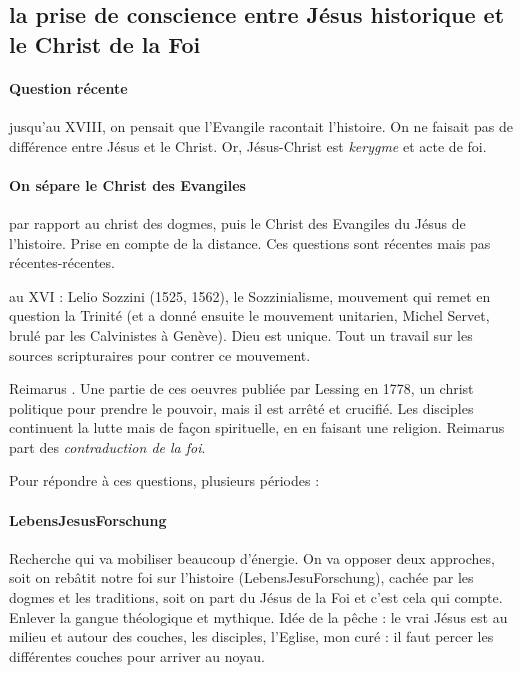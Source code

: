 \subsection{la prise de conscience entre Jésus historique et le Christ de la Foi}

\paragraph{Question récente} jusqu'au XVIII, on pensait que l'Evangile racontait l'histoire. On ne faisait pas de différence entre Jésus et le Christ. Or, Jésus-Christ est \textit{kerygme} et acte de foi.

\paragraph{On sépare le Christ des Evangiles} par rapport au christ des dogmes, puis le Christ des Evangiles du Jésus de l'histoire. Prise en compte de la distance. Ces questions sont récentes mais pas récentes-récentes. 
\bi 
\item au XVI : Lelio Sozzini (1525, 1562), le Sozzinialisme, mouvement qui remet en question la Trinité (et a donné ensuite le mouvement unitarien, Michel Servet, brulé par les Calvinistes à Genève). Dieu est unique. Tout un travail sur les sources scripturaires pour contrer ce mouvement.
\item Reimarus . Une partie de ces oeuvres publiée par Lessing en 1778, un christ politique pour prendre le pouvoir, mais il est arrêté et crucifié. Les disciples continuent la lutte mais de façon spirituelle, en en faisant une religion. Reimarus part des \textit{contraduction de la foi}. 
\ei 

Pour répondre à ces questions, plusieurs périodes : 

\paragraph{LebensJesusForschung} Recherche qui va mobiliser beaucoup d'énergie. On va opposer deux approches, soit on rebâtit notre foi sur l'histoire (LebensJesuForschung),  cachée par les dogmes et les traditions, soit on part du Jésus de la Foi et c'est cela qui compte. Enlever la gangue théologique et mythique. Idée de la pêche : le vrai Jésus est au milieu et autour des couches, les disciples, l'Eglise, mon curé : il faut percer les différentes couches pour arriver au noyau. 

